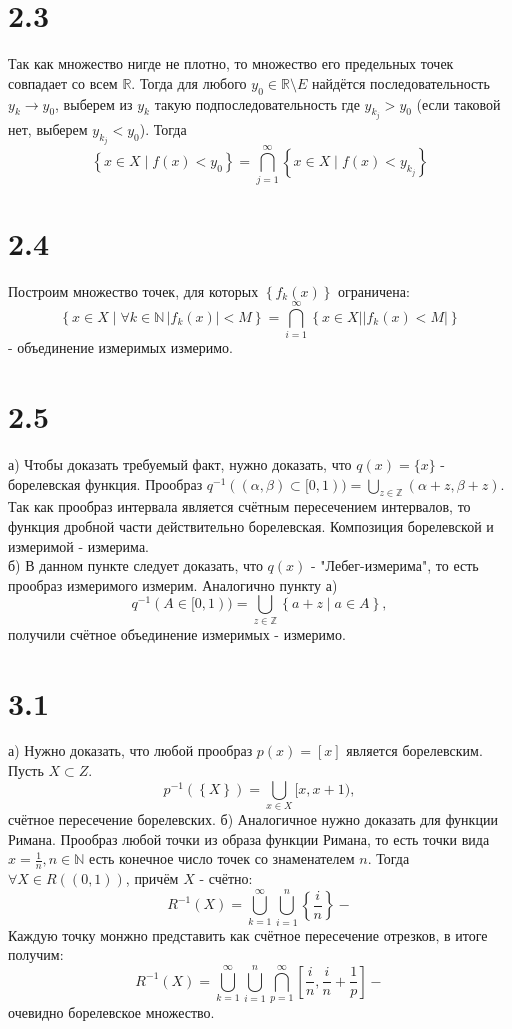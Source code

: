 \documentclass[12pt]{article}
\begin{document}
\section{2.3}
Так как множество нигде не плотно, то множество его предельных точек совпадает со всем $\mathbb{R}$. 
Тогда для любого $y_0 \in \mathbb{R} \setminus E$ найдётся последовательность $y_k \to y_0$, выберем из 
$y_k$ такую подпоследовательность где $y_{k_j} > y_0$ (если таковой нет, выберем $y_{k_j} < y_0$). 
Тогда
\[
    \left\{ x \in X \mid f(x) < y_0 \right\} = \bigcap_{j = 1}^{\infty} \left\{ x \in X \mid f(x) < y_{k_j} \right\}
\]
\section{2.4}
Построим множество точек, для которых $\left\{ f_k(x) \right\} $ ограничена: 
\[
    \left\{ x \in X \mid \forall k \in \mathbb{N} \, \vert f_k(x) \vert  < M \right\} = 
    \bigcap_{i=1}^{\infty} \left\{ x \in X \mid \vert f_k(x) < M \vert  \right\}  
\] 
- объединение измеримых измеримо.
\section{2.5}
а) 
Чтобы доказать требуемый факт, нужно доказать, что $q(x) = \{x\}$ - борелевская функция. 
Прообраз $q^{-1}((\alpha, \beta) \subset [0, 1)) = \bigcup_{z \in \mathbb{Z}} (\alpha + z, \beta + z)$. 
Так как прообраз интервала является счётным пересечением интервалов, то функция дробной части действительно 
борелевская. Композиция борелевской и измеримой - измерима.
\\ б) 
В данном пункте следует доказать, что $q(x)$ - "Лебег-измерима", то есть прообраз измеримого измерим. 
Аналогично пункту а) 
\[
    q^{-1} (A \in [0, 1)) = \bigcup_{z \in \mathbb{Z}} \left\{ a + z \mid a \in A \right\},   
\]
получили счётное объединение измеримых - измеримо.
\section{3.1}
а) Нужно доказать, что любой прообраз $p(x) = [x]$ является борелевским. 
Пусть $X \subset Z$.
\[
    p^{-1}(\left\{ X \right\}) = \bigcup_{x \in X} [x, x + 1), 
\]
счётное пересечение борелевских. 
б) Аналогичное нужно доказать для функции Римана. Прообраз любой точки из образа функции Римана, то есть 
точки вида $x = \frac{1}{n}, n \in \mathbb{N}$ есть конечное число точек со знаменателем $n$. 
Тогда $\forall X \in R((0, 1))$, причём $X$ - счётно: 
\[
    R^{-1}(X) = \bigcup_{k=1}^{\infty} \bigcup_{i=1}^{n} \left\{ \frac{i}{n} \right\} - 
\]   
Каждую точку монжно представить как счётное пересечение отрезков, в итоге получим: 
\[
    R^{-1}(X) = \bigcup_{k=1}^{\infty} \bigcup_{i=1}^{n} \bigcap_{p=1}^{\infty} \left[ \frac{i}{n}, \frac{i}{n} + \frac{1}{p} \right]   - 
\] 
очевидно борелевское множество.
\end{document}
